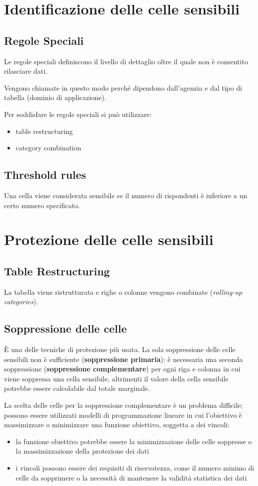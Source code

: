 \documentclass{report}
\begin{document}
\section{Identificazione delle celle sensibili}

\subsection{Regole Speciali}
Le regole speciali definiscono il livello di dettaglio oltre il quale non è consentito
rilasciare dati.

Vengono chiamate in questo modo perché dipendono dall'agenzia e dal tipo di tabella
(dominio di applicazione).

Per soddisfare le regole speciali si può utilizzare:
\begin{itemize}
    \item table restructuring
    \item category combination
\end{itemize}

\subsection{Threshold rules}
Una cella viene considerata sensibile se il numero di rispondenti è inferiore 
a un certo numero specificato. 

\section{Protezione delle celle sensibili}
\subsection{Table Restructuring}
La tabella viene ristrutturata e righe o colonne vengono 
combinate (\textit{rolling-up categories}).

\subsection{Soppressione delle celle}
È una delle tecniche di protezione più usata. La sola soppressione delle celle 
sensibili non è sufficiente (\textbf{soppressione primaria}): è necessaria una seconda soppressione (\textbf{soppressione complementare})
per ogni riga e colonna in cui viene soppressa una cella sensibile, altrimenti 
il valore della cella sensibile potrebbe essere calcolabile dal totale marginale.

La scelta delle celle per la soppressione complementare è un problema difficile; possono essere
utilizzati modelli di programmazione lineare in cui l'obiettivo è 
massimizzare o minimizzare una funzione obiettivo, soggetta a dei vincoli:
\begin{itemize}
    \item la funzione obiettivo potrebbe essere la minimizzazione delle celle soppresse o la massimizzazione della protezione dei dati 
    \item i vincoli possono essere dei requisiti di riservatezza, come il numero minimo di celle da sopprimere o la necessità di mantenere la validità statistica dei dati 
\end{itemize}
\end{document}
